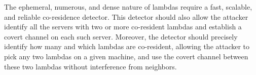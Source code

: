 The ephemeral, numerous, and dense nature of lambdas require a fast, scalable,
and reliable co-residence detector. This detector should also allow the attacker
identify all the servers with two or more co-resident lambdas and establish a
covert channel on each such server. Moreover, the detector should precisely identify how many
and which lambdas are
co-resident, allowing the attacker to pick any two lambdas on a given machine,
and use the covert channel between these two lambdas without interference from
neighbors. 


